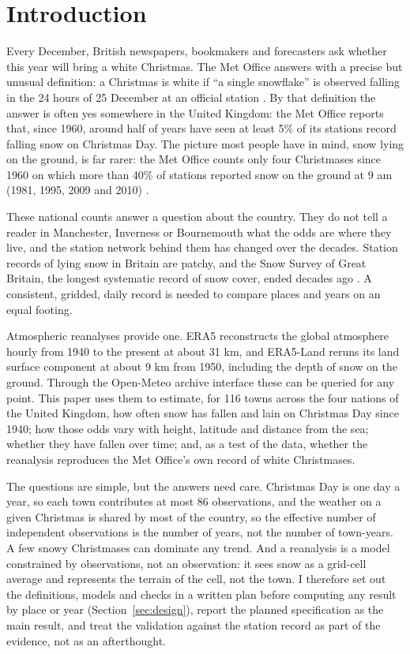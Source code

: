 \documentclass[11pt,a4paper]{article}
\begin{document}
\section{Introduction}
Every December, British newspapers, bookmakers and forecasters ask whether this year will bring a white Christmas. The Met Office answers with a precise but unusual definition: a Christmas is white if ``a single snowflake'' is observed falling in the 24 hours of 25 December at an official station \citep{metoffice2024}. By that definition the answer is often yes somewhere in the United Kingdom: the Met Office reports that, since 1960, around half of years have seen at least 5\% of its stations record falling snow on Christmas Day. The picture most people have in mind, snow lying on the ground, is far rarer: the Met Office counts only four Christmases since 1960 on which more than 40\% of stations reported snow on the ground at 9 am (1981, 1995, 2009 and 2010) \citep{metoffice2024,metoffice2025}.

These national counts answer a question about the country. They do not tell a reader in Manchester, Inverness or Bournemouth what the odds are where they live, and the station network behind them has changed over the decades. Station records of lying snow in Britain are patchy, and the Snow Survey of Great Britain, the longest systematic record of snow cover, ended decades ago \citep{brown2019,brown2020}. A consistent, gridded, daily record is needed to compare places and years on an equal footing.

Atmospheric reanalyses provide one. ERA5 \citep{hersbach2020} reconstructs the global atmosphere hourly from 1940 to the present at about 31 km, and ERA5-Land \citep{munoz2021} reruns its land surface component at about 9 km from 1950, including the depth of snow on the ground. Through the Open-Meteo archive interface \citep{zippenfenig2023} these can be queried for any point. This paper uses them to estimate, for 116 towns across the four nations of the United Kingdom, how often snow has fallen and lain on Christmas Day since 1940; how those odds vary with height, latitude and distance from the sea; whether they have fallen over time; and, as a test of the data, whether the reanalysis reproduces the Met Office's own record of white Christmases.

The questions are simple, but the answers need care. Christmas Day is one day a year, so each town contributes at most 86 observations, and the weather on a given Christmas is shared by most of the country, so the effective number of independent observations is the number of years, not the number of town-years. A few snowy Christmases can dominate any trend. And a reanalysis is a model constrained by observations, not an observation: it sees snow as a grid-cell average and represents the terrain of the cell, not the town. I therefore set out the definitions, models and checks in a written plan before computing any result by place or year (Section~\ref{sec:design}), report the planned specification as the main result, and treat the validation against the station record as part of the evidence, not as an afterthought.
\end{document}
